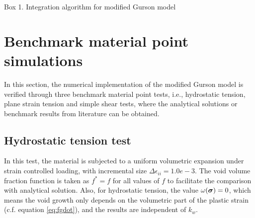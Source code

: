 Box 1. Integration algorithm for modified Gurson model\\


\section{Benchmark material point simulations}
In this section, the numerical implementation of the modified Gurson
model is verified through three benchmark material point tests, i.e.,
hydrostatic tension, plane strain tension and simple shear tests,
where the analytical solutions or benchmark results from literature
can be obtained.

\subsection{Hydrostatic tension test}
In this test, the material is subjected to a uniform volumetric
expansion under strain controlled loading, with incremental size
$\Delta\epsilon_{ii} = 1.0e-3$. The void volume fraction function is
taken as $f^* = f$ for all values of $f$ to facilitate the comparison
with analytical solution. Also, for hydrostatic tension, the value
$\omega({\boldsymbol{\sigma}}) = 0$, which means the void growth only depends
on the volumetric part of the plastic strain (c.f. equation
\eqref{eq:fgdot}), and the results are independent of $k_w$.

